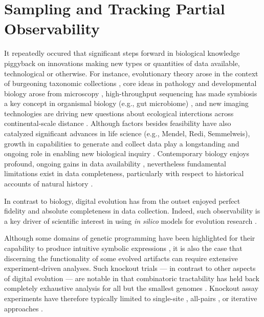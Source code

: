 \section{Sampling and Tracking Partial Observability}

It repeatedly occured that significant steps forward in biological knowledge piggyback on innovations making new types or quantities of data available, technological or otherwise.
For instance, evolutionary theory arose in the context of burgeoning taxonomic collections \citep{winsor2009taxonomy}, core ideas in pathology and developmental biology arose from microscopy \citep{turner1890cell}, high-throughput sequencing has made symbiosis a key concept in organismal biology (e.g., gut microbiome) \citep{durack2019gut}, and new imaging technologies are driving new questions about ecological interctions across continental-scale distance \citep{stark2016toward}.
Although factors besides feasibility have also catalyzed significant advances in life science (e.g., Mendel, Redi, Semmelweis), growth in capabilities to generate and collect data play a longstanding and ongoing role in enabling new biological inquiry \citep{strasser2012data}.
Contemporary biology enjoys profound, ongoing gains in data availability \citep{sulston1983embryonic,sheth2017multiplex,weeks2023deep}, nevertheless fundamental limitations exist in data completeness, particularly with respect to historical accounts of natural history \citep{benton2011assessing,delsuc2005phylogenomics}.

In contrast to biology, digital evolution has from the outset enjoyed perfect fidelity and absolute completeness in data collection.
Indeed, such observability is a key driver of scientific interest in using \textit{in silico} models for evolution research \citep{o2003digital}.

Although some domains of genetic programming have been highlighted for their capability to produce intuitive symbolic expressions \citep{hu2023genetic,javed2022simplification}, it is also the case that discerning the functionality of some evolved artifacts can require extensive experiment-driven analyses.
Such knockout trials --- in contrast to other aspects of digital evolution --- are notable in that combinatoric tractability has held back completely exhaustive analysis for all but the smallest genomes \citep{nitash2021information}.
Knockout assay experiments have therefore typically limited to single-site \citep{adami2006digital}, all-pairs \citep{kumawat2023fluctuating}, or iterative approaches \citep{langdon2014improving,moreno2024case}.

